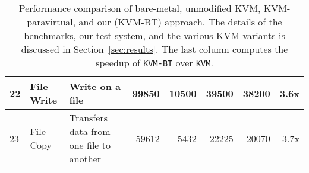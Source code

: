 \begin{table*}
\begin{tabular}{|l@{} | p{3.0cm} |p{3.8cm} | r r r r r|}
22	&	File Write 	& Write on a file	&	99850	&	10500 	&	39500	&	38200	&	3.6x	\\	\hline
23	&	File Copy 	& Transfers data from one file to another	&	59612	&	5432 	&	22225	&	20070	&	3.7x	\\	\hline
        \hline
      \end{tabular}
\caption{\label{tab:kvm_performance}Performance comparison of bare-metal, unmodified KVM, KVM-paravirtual, and our (KVM-BT) approach. The details of
the benchmarks, our test system, and the various KVM variants is discussed in Section~\ref{sec:results}. The last column computes the speedup of {\tt KVM-BT} over {\tt KVM}.}
\end{table*} 

